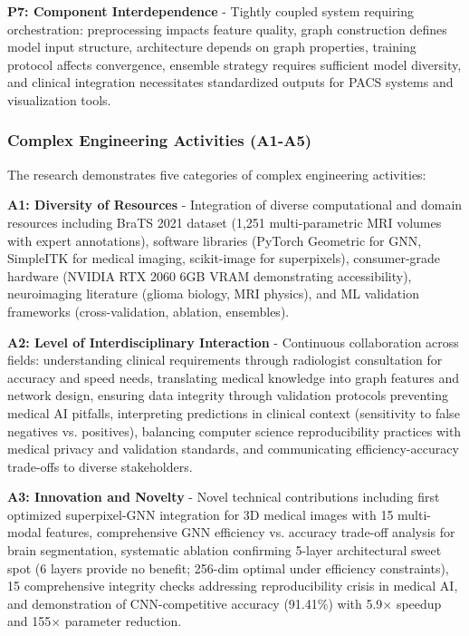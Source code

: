 \documentclass{article}
\begin{document}
\textbf{P7: Component Interdependence} - Tightly coupled system requiring orchestration: preprocessing impacts feature quality, graph construction defines model input structure, architecture depends on graph properties, training protocol affects convergence, ensemble strategy requires sufficient model diversity, and clinical integration necessitates standardized outputs for PACS systems and visualization tools.

\subsubsection{Complex Engineering Activities (A1-A5)}

The research demonstrates five categories of complex engineering activities:

\textbf{A1: Diversity of Resources} - Integration of diverse computational and domain resources including BraTS 2021 dataset (1,251 multi-parametric MRI volumes with expert annotations), software libraries (PyTorch Geometric for GNN, SimpleITK for medical imaging, scikit-image for superpixels), consumer-grade hardware (NVIDIA RTX 2060 6GB VRAM demonstrating accessibility), neuroimaging literature (glioma biology, MRI physics), and ML validation frameworks (cross-validation, ablation, ensembles).

\textbf{A2: Level of Interdisciplinary Interaction} - Continuous collaboration across fields: understanding clinical requirements through radiologist consultation for accuracy and speed needs, translating medical knowledge into graph features and network design, ensuring data integrity through validation protocols preventing medical AI pitfalls, interpreting predictions in clinical context (sensitivity to false negatives vs. positives), balancing computer science reproducibility practices with medical privacy and validation standards, and communicating efficiency-accuracy trade-offs to diverse stakeholders.

\textbf{A3: Innovation and Novelty} - Novel technical contributions including first optimized superpixel-GNN integration for 3D medical images with 15 multi-modal features, comprehensive GNN efficiency vs. accuracy trade-off analysis for brain segmentation, systematic ablation confirming 5-layer architectural sweet spot (6 layers provide no benefit; 256-dim optimal under efficiency constraints), 15 comprehensive integrity checks addressing reproducibility crisis in medical AI, and demonstration of CNN-competitive accuracy (91.41\%) with 5.9$\times$ speedup and 155$\times$ parameter reduction.
\end{document}
